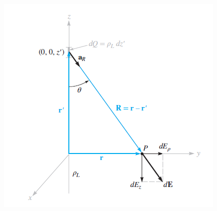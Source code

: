 \documentclass{article}
\begin{document}
\begin{figure}[H]
    \center
    \includegraphics[scale=0.5]{inf_line_charge}
\end{figure}
\end{document}
